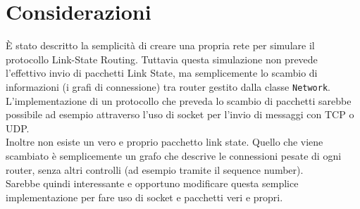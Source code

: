 \documentclass{article}
\begin{document}
\section{Considerazioni}
È stato descritto la semplicità di creare una propria rete per simulare il protocollo Link-State Routing. Tuttavia questa simulazione non prevede l'effettivo invio di pacchetti Link State, ma semplicemente lo scambio di informazioni (i grafi di connessione) tra router gestito dalla classe \texttt{Network}. L'implementazione di un protocollo che preveda lo scambio di pacchetti sarebbe possibile ad esempio attraverso l'uso di socket per l'invio di messaggi con TCP o UDP.\\
Inoltre non esiste un vero e proprio pacchetto link state. Quello che viene scambiato è semplicemente un grafo che descrive le connessioni pesate di ogni router, senza altri controlli (ad esempio tramite il sequence number).\\
Sarebbe quindi interessante e opportuno modificare questa semplice implementazione per fare uso di socket e pacchetti veri e propri.
\end{document}
